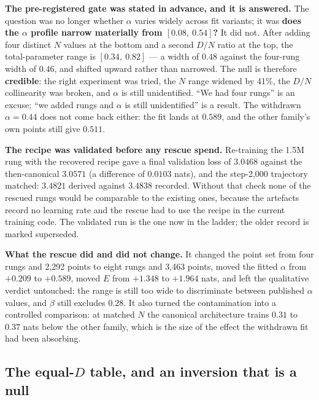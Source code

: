 \documentclass[11pt,a4paper]{article}
\begin{document}
\textbf{The pre-registered gate was stated in advance, and it is answered.} The
question was no longer whether $\alpha$ varies widely across fit variants; it
was \textbf{does the $\alpha$ profile narrow materially from
$[0.08,\ 0.54]$?} It did not. After adding four distinct $N$ values at the
bottom and a second $D/N$ ratio at the top, the total-parameter range is
$[0.34,\ 0.82]$ --- a width of $0.48$ against the four-rung width of $0.46$,
and shifted upward rather than narrowed. The null is therefore
\textbf{credible}: the right experiment was tried, the $N$ range widened by
41\%, the $D/N$ collinearity was broken, and $\alpha$ is still unidentified.
``We had four rungs'' is an excuse; ``we added rungs and $\alpha$ is still
unidentified'' is a result. The withdrawn $\alpha = 0.44$ does not come back
either: the fit lands at $0.589$, and the other family's own points still give
$0.511$. %

\textbf{The recipe was validated before any rescue spend.} Re-training the
1.5M rung with the recovered recipe gave a final validation loss of $3.0468$
against the then-canonical $3.0571$ (a difference of $0.0103$ nats), and the
step-2,000 trajectory matched: $3.4821$ derived against $3.4838$ recorded.
Without that check none of the rescued rungs would be comparable to the
existing ones, because the artefacts record no learning rate and the rescue
had to use the recipe in the current training code. The validated run is the
one now in the ladder; the older record is marked superseded.

\textbf{What the rescue did and did not change.} It changed the point set from
four rungs and 2,292 points to eight rungs and 3,463 points, moved the fitted
$\alpha$ from $+0.209$ to $+0.589$, moved $E$ from $+1.348$ to $+1.964$ nats,
and left the qualitative verdict untouched: the range is still too wide to
discriminate between published $\alpha$ values, and $\beta$ still excludes
$0.28$. It also turned the contamination into a controlled comparison: at
matched $N$ the canonical architecture trains $0.31$ to $0.37$ nats below the
other family, which is the size of the effect the withdrawn fit had been
absorbing. %

\subsection{The equal-$D$ table, and an inversion that is a null}
\label{sec:act4-equalD}
\end{document}
